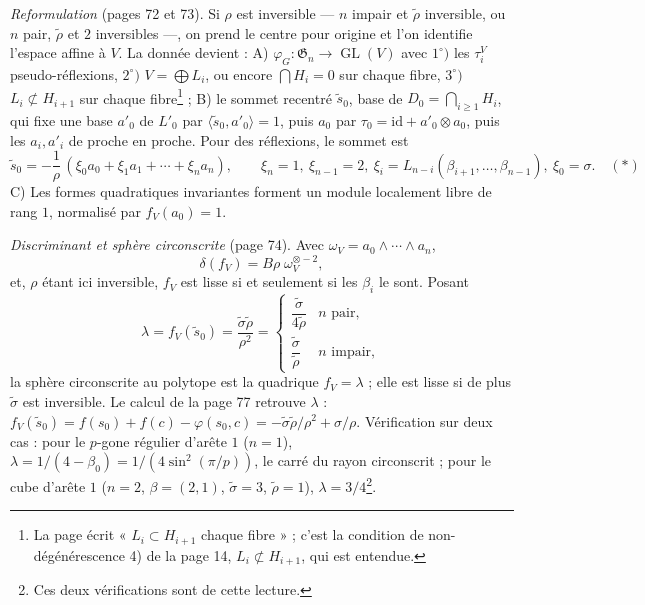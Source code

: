 \documentclass[11pt,a4paper]{article}
\begin{document}
\emph{Reformulation} (pages 72 et 73). Si $\rho$ est inversible --- $n$ impair
et $\tilde\rho$ inversible, ou $n$ pair, $\tilde\rho$ et $2$ inversibles ---, on
prend le centre pour origine et l'on identifie l'espace affine à $V$. La donnée
devient : A) $\varphi_G \colon \mathfrak{G}_n \to \operatorname{GL}(V)$ avec
$1^\circ)$ les $\tau_i^V$ pseudo-réflexions, $2^\circ)$ $V = \bigoplus L_i$, ou
encore $\bigcap H_i = 0$ sur chaque fibre, $3^\circ)$ $L_i \not\subset H_{i+1}$
sur chaque fibre\footnote{La page écrit « $L_i \subset H_{i+1}$ chaque fibre » ;
c'est la condition de non-dégénérescence 4) de la page 14, $L_i \not\subset
H_{i+1}$, qui est entendue.} ; B) le sommet recentré $\tilde s_0$, base de $D_0
= \bigcap_{i \geqslant 1} H_i$, qui fixe une base $a'_0$ de $L'_0$ par $\langle
\tilde s_0, a'_0 \rangle = 1$, puis $a_0$ par $\tau_0 = \mathrm{id} + a'_0
\otimes a_0$, puis les $a_i, a'_i$ de proche en proche. Pour des réflexions, le
sommet est
\[
\tilde s_0 = -\frac{1}{\rho}\,(\xi_0 a_0 + \xi_1 a_1 + \cdots + \xi_n a_n),
\qquad \xi_n = 1,\ \xi_{n-1} = 2,\ \xi_i = L_{n-i}(\beta_{i+1}, \ldots,
\beta_{n-1}),\ \xi_0 = \sigma. \quad (*)
\]
C) Les formes quadratiques invariantes forment un module localement libre de
rang $1$, normalisé par $f_V(a_0) = 1$.

\emph{Discriminant et sphère circonscrite} (page 74). Avec $\omega_V = a_0 \wedge
\cdots \wedge a_n$,
\[
\delta(f_V) = B\rho\; \omega_V^{\otimes -2},
\]
et, $\rho$ étant ici inversible, $f_V$ est lisse si et seulement si les
$\beta_i$ le sont. Posant
\[
\lambda = f_V(\tilde s_0) = \frac{\tilde\sigma\tilde\rho}{\rho^2} =
\begin{cases} \dfrac{\tilde\sigma}{4\tilde\rho} & n \text{ pair}, \\[1.5ex]
\dfrac{\tilde\sigma}{\tilde\rho} & n \text{ impair}, \end{cases}
\]
la sphère circonscrite au polytope est la quadrique $f_V = \lambda$ ; elle est
lisse si de plus $\tilde\sigma$ est inversible. Le calcul de la page 77
retrouve $\lambda$ : $f_V(\tilde s_0) = f(s_0) + f(c) - \varphi(s_0, c) =
-\tilde\sigma\tilde\rho/\rho^2 + \sigma/\rho$. Vérification sur deux cas : pour le
$p$-gone régulier d'arête $1$ ($n = 1$), $\lambda = 1/(4 - \beta_0) =
1/(4\sin^2(\pi/p))$, le carré du rayon circonscrit ; pour le cube d'arête $1$
($n = 2$, $\beta = (2, 1)$, $\tilde\sigma = 3$, $\tilde\rho = 1$), $\lambda =
3/4$\footnote{Ces deux vérifications sont de cette lecture.}.
\end{document}
